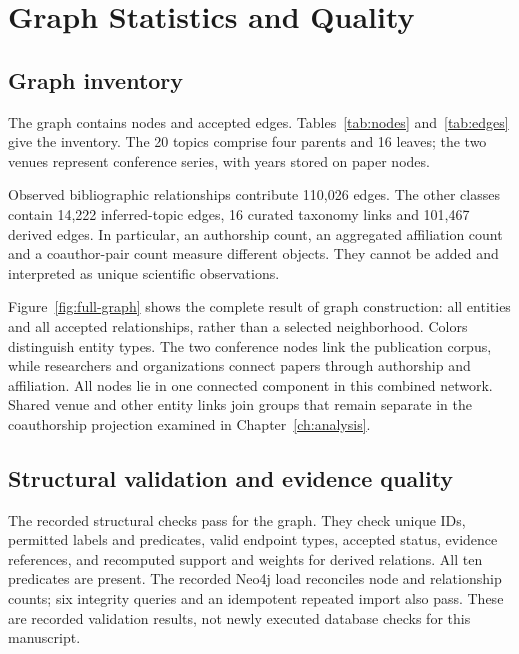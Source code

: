 \chapter{Graph Statistics and Quality}
\label{ch:quality}
\section{Graph inventory}
The graph contains \TotalNodes{} nodes and \TotalEdges{} accepted edges.
Tables~\ref{tab:nodes} and~\ref{tab:edges} give the inventory. The 20 topics
comprise four parents and 16 leaves; the two venues represent conference
series, with years stored on paper nodes.



\FloatBarrier

Observed bibliographic relationships contribute 110,026 edges. The other
classes contain 14,222 inferred-topic edges, 16 curated taxonomy links and
101,467 derived edges. In particular, an authorship count, an aggregated
affiliation count and a coauthor-pair count measure different objects. They
cannot be added and interpreted as unique scientific observations.


Figure~\ref{fig:full-graph} shows the complete result of graph construction:
all entities and all accepted relationships, rather than a selected neighborhood.
Colors distinguish entity types. The two conference nodes link the publication
corpus, while researchers and organizations connect papers through authorship
and affiliation. All nodes lie in one connected component in this combined
network. Shared venue and other entity links join groups that remain separate
in the coauthorship projection examined in Chapter~\ref{ch:analysis}.

\FloatBarrier
\clearpage

\Needspace{15cm}
\section{Structural validation and evidence quality}
The recorded structural checks pass for the graph. They check unique IDs, permitted
labels and predicates, valid endpoint types, accepted status, evidence references,
and recomputed support and weights for derived relations. All ten predicates are
present. The recorded Neo4j load reconciles node and relationship counts;
six integrity queries and an idempotent repeated import also pass. These are
recorded validation results, not newly executed database checks for this manuscript.


